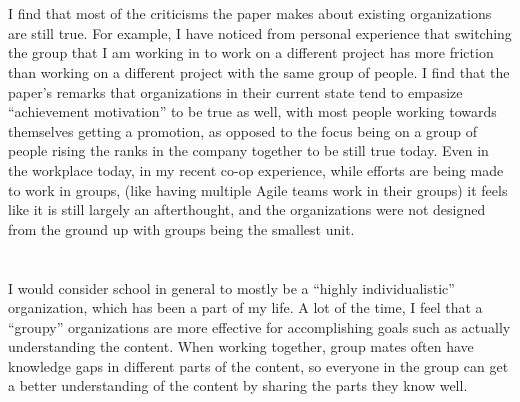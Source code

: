 \documentclass[letterpaper,12pt]{article}
\begin{document}
  \section{}
  I find that most of the criticisms the paper makes about existing
  organizations are still true. For example, I have noticed from personal
  experience that switching the group that I am working in to work on a
  different project has more friction than working on a different project with
  the same group of people. I find that the paper's remarks that organizations
  in their current state tend to empasize ``achievement motivation'' to be true
  as well, with most people working towards themselves getting a promotion, as
  opposed to the focus being on a group of people rising the ranks in the
  company together to be still true today.  Even in the workplace today, in my
  recent co-op experience, while efforts are being made to work in groups,
  (like having multiple Agile teams work in their groups) it feels like it is
  still largely an afterthought, and the organizations were not designed from
  the ground up with groups being the smallest unit.



  \section{}
  I would consider school in general to mostly be a ``highly individualistic''
  organization, which has been a part of my life.
  A lot of the time, I feel that a ``groupy'' organizations are more effective
  for accomplishing goals such as actually understanding the content. When
  working together, group mates often have knowledge gaps in different parts of
  the content, so everyone in the group can get a better understanding of the
  content by sharing the parts they know well.
\end{document}
